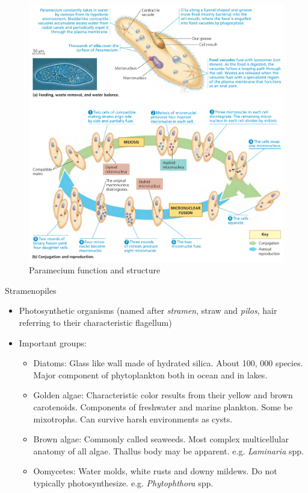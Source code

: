 \documentclass[ignorenonframetext,aspectratio=169]{beamer}
\providecommand{\tightlist}{%
  \setlength{\itemsep}{0pt}\setlength{\parskip}{0pt}}
\begin{document}
\begin{frame}{}
\protect\hypertarget{section-18}{}

\begin{figure}
\includegraphics[width=0.45\linewidth]{./../images/apicomplexans_paramecium} \caption{Paramecium function and structure}\label{fig:apicomplexans-features}
\end{figure}

\end{frame}

\begin{frame}{Stramenopiles}
\protect\hypertarget{stramenopiles}{}

\begin{itemize}
\tightlist
\item
  Photosynthetic organisms (named after \emph{stramen}, straw and
  \emph{pilos}, hair referring to their characteristic flagellum)
\item
  Important groups:

  \begin{itemize}
  \tightlist
  \item
    Diatoms: Glass like wall made of hydrated silica. About 100, 000
    species. Major component of phytoplankton both in ocean and in
    lakes.
  \item
    Golden algae: Characteristic color results from their yellow and
    brown carotenoids. Components of freshwater and marine plankton.
    Some be mixotrophs. Can survive harsh environments as cysts.
  \item
    Brown algae: Commonly called seaweeds. Most complex multicellular
    anatomy of all algae. Thallus body may be apparent. e.g.
    \emph{Laminaria} spp.
  \item
    Oomycetes: Water molds, white rusts and downy mildews. Do not
    typically photosynthesize. e.g. \emph{Phytophthora} spp.
  \end{itemize}
\end{itemize}

\end{frame}
\end{document}
